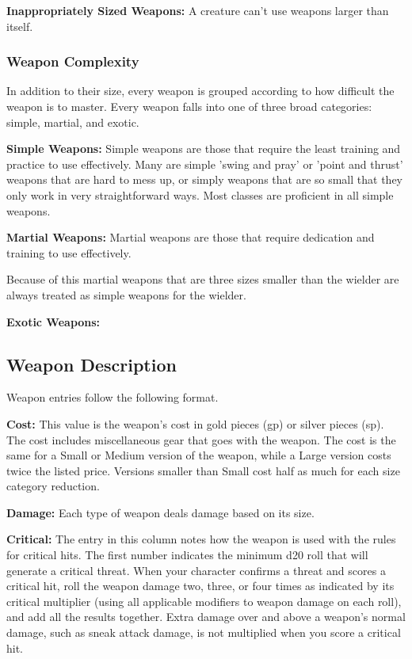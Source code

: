 \textbf{Inappropriately Sized Weapons:} A creature can't use weapons larger than itself.

\subsubsection{Weapon Complexity}
In addition to their size, every weapon is grouped according to how difficult the weapon is to master. Every weapon falls into one of three broad categories: simple, martial, and exotic. 

\textbf{Simple Weapons:} Simple weapons are those that require the least training and practice to use effectively. Many are simple 'swing and pray' or 'point and thrust' weapons that are hard to mess up, or simply weapons that are so small that they only work in very straightforward ways. Most classes are proficient in all simple weapons.

\textbf{Martial Weapons:} Martial weapons are those that require dedication and training to use effectively. 

Because of this martial weapons that are three sizes smaller than the wielder are always treated as simple weapons for the wielder.

\textbf{Exotic Weapons:} 

\subsection{Weapon Description}
Weapon entries follow the following format.

\noindent\textbf{Cost:} This value is the weapon's cost in gold pieces (gp) or silver pieces (sp). The cost includes miscellaneous gear that goes with the weapon. The cost is the same for a Small or Medium version of the weapon, while a Large version costs twice the listed price. Versions smaller than Small cost half as much for each size category reduction.

\textbf{Damage:} Each type of weapon deals damage based on its size.

\textbf{Critical:} The entry in this column notes how the weapon is used with the rules for critical hits. The first number indicates the minimum d20 roll that will generate a critical threat. When your character confirms a threat and scores a critical hit, roll the weapon damage two, three, or four times as indicated by its critical multiplier (using all applicable modifiers to weapon damage on each roll), and add all the results together. Extra damage over and above a weapon's normal damage, such as sneak attack damage, is not multiplied when you score a critical hit.

